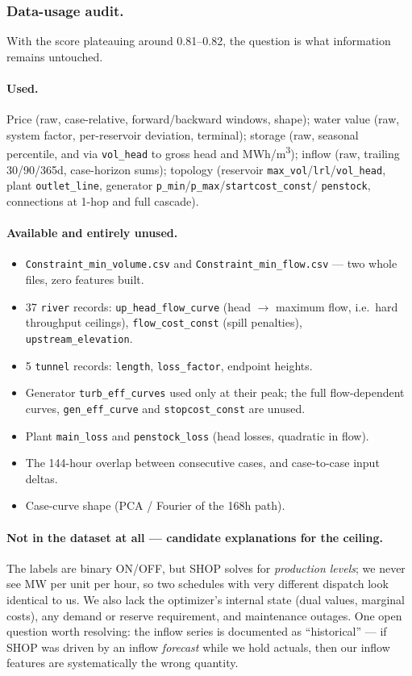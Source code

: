 \subsubsection*{Data-usage audit.}
With the score plateauing around 0.81--0.82, the question is what information remains untouched.

\paragraph{Used.} Price (raw, case-relative, forward/backward windows, shape); water value (raw,
system factor, per-reservoir deviation, terminal); storage (raw, seasonal percentile, and via
\texttt{vol\_head} to gross head and MWh/m\textsuperscript{3}); inflow (raw, trailing 30/90/365d,
case-horizon sums); topology (reservoir \texttt{max\_vol}/\texttt{lrl}/\texttt{vol\_head}, plant
\texttt{outlet\_line}, generator \texttt{p\_min}/\texttt{p\_max}/\texttt{startcost\_const}/
\texttt{penstock}, connections at 1-hop and full cascade).

\paragraph{Available and entirely unused.}
\begin{itemize}\itemsep1pt
  \item \texttt{Constraint\_min\_volume.csv} and \texttt{Constraint\_min\_flow.csv} --- two whole
        files, zero features built.
  \item 37 \texttt{river} records: \texttt{up\_head\_flow\_curve} (head $\to$ maximum flow, i.e.\
        hard throughput ceilings), \texttt{flow\_cost\_const} (spill penalties),
        \texttt{upstream\_elevation}.
  \item 5 \texttt{tunnel} records: \texttt{length}, \texttt{loss\_factor}, endpoint heights.
  \item Generator \texttt{turb\_eff\_curves} used only at their peak; the full flow-dependent
        curves, \texttt{gen\_eff\_curve} and \texttt{stopcost\_const} are unused.
  \item Plant \texttt{main\_loss} and \texttt{penstock\_loss} (head losses, quadratic in flow).
  \item The 144-hour overlap between consecutive cases, and case-to-case input deltas.
  \item Case-curve shape (PCA / Fourier of the 168h path).
\end{itemize}

\paragraph{Not in the dataset at all --- candidate explanations for the ceiling.}
The labels are binary ON/OFF, but SHOP solves for \emph{production levels}; we never see MW per
unit per hour, so two schedules with very different dispatch look identical to us. We also lack
the optimizer's internal state (dual values, marginal costs), any demand or reserve requirement,
and maintenance outages. One open question worth resolving: the inflow series is documented as
``historical'' --- if SHOP was driven by an inflow \emph{forecast} while we hold actuals, then our
inflow features are systematically the wrong quantity.

